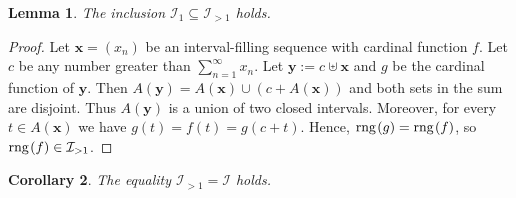 \documentclass{amsart}
\newtheorem{theorem}{Theorem}[section]
\newtheorem{lemma}[theorem]{Lemma}
\newtheorem{corollary}[theorem]{Corollary}
\theoremstyle{definition}
\newtheorem{definition}[theorem]{Definition}
\newtheorem{example}[theorem]{Example}
\newcommand{\rng}{{\rm rng} \hspace{0.03cm}}
\begin{document}
\begin{lemma}
The inclusion $\mathcal{I}_1\subseteq \mathcal{I}_{>1}$ holds.
\end{lemma}
\begin{proof}
Let $\mathbf{x}=(x_{n})$ be an interval-filling sequence with cardinal function $f$. Let $c$ be any number greater than $\sum_{n=1}^{\infty}x_{n}$. Let $\mathbf{y}:=c\uplus \mathbf{x}$ and $g$ be the cardinal function of $\mathbf{y}$. Then $A(\mathbf{y})=A(\mathbf{x})\cup (c+A(\mathbf{x}))$ and both sets in the sum are disjoint. Thus $A(\mathbf{y})$ is a union of two closed intervals. Moreover, for every $t\in A(\mathbf{x})$ we have $g(t)=f(t)=g(c+t)$. Hence, $\rng(g)=\rng(f)$, so $\rng (f)\in\mathcal{I}_{>1}$.
\end{proof}

\begin{corollary}
The equality $\mathcal{I}_{>1}=\mathcal{I}$ holds.
\end{corollary}





\end{document}
